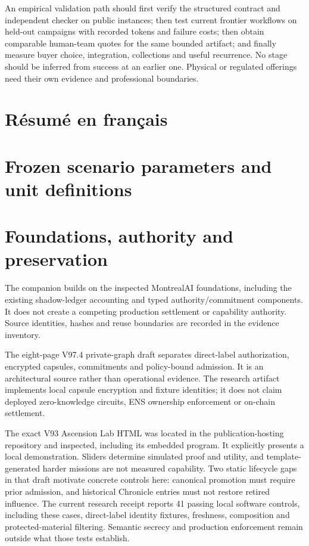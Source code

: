 \documentclass[11pt,a4paper]{article}
\begin{document}
An empirical validation path should first verify the structured contract and independent checker on public instances; then test current frontier workflows on held-out campaigns with recorded tokens and failure costs; then obtain comparable human-team quotes for the same bounded artifact; and finally measure buyer choice, integration, collections and useful recurrence. No stage should be inferred from success at an earlier one. Physical or regulated offerings need their own evidence and professional boundaries.

\section*{Résumé en français}
\ResultFrench

\clearpage
\appendix
\section{Frozen scenario parameters and unit definitions}




\section{Foundations, authority and preservation}

The companion builds on the inspected MontrealAI foundations, including the existing shadow-ledger accounting and typed authority/commitment components. It does not create a competing production settlement or capability authority. Source identities, hashes and reuse boundaries are recorded in the evidence inventory.\cite{Foundations}

The eight-page V97.4 private-graph draft separates direct-label authorization, encrypted capsules, commitments and policy-bound admission. It is an architectural source rather than operational evidence. The research artifact implements local capsule encryption and fixture identities; it does not claim deployed zero-knowledge circuits, ENS ownership enforcement or on-chain settlement.\cite{V97}

The exact V93 Ascension Lab HTML was located in the publication-hosting repository and inspected, including its embedded program. It explicitly presents a local demonstration. Sliders determine simulated proof and utility, and template-generated harder missions are not measured capability. Two static lifecycle gaps in that draft motivate concrete controls here: canonical promotion must require prior admission, and historical Chronicle entries must not restore retired influence. The current research receipt reports 41 passing local software controls, including these cases, direct-label identity fixtures, freshness, composition and protected-material filtering. Semantic secrecy and production enforcement remain outside what those tests establish.\cite{V93}
\end{document}
